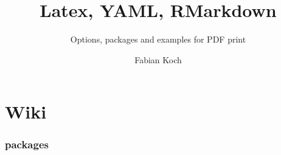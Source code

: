 \documentclass[
  twoside]{article}
\title{Latex, YAML, RMarkdown}
\subtitle{Options, packages and examples for PDF print}
\author{Fabian Koch}
\date{}
\begin{document}
\maketitle

\newpage 
\tableofcontents

\newpage

\newpage

\hypertarget{wiki}{%
\section{Wiki}\label{wiki}}

\hypertarget{packages}{%
\subsubsection{packages}\label{packages}}
\end{document}

